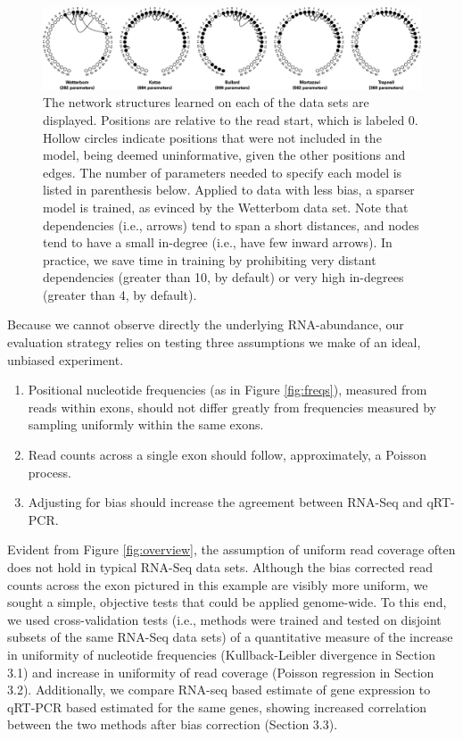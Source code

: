 \documentclass{bioinfo}
\begin{document}
\begin{figure}
\centerline{\includegraphics[width=\textwidth]{models.eps}}
\caption{
The network structures learned on each of the data sets are displayed. Positions
are relative to the read start, which is labeled 0. Hollow circles indicate
positions that were not included in the model, being deemed uninformative, given
the other positions and edges. The number of parameters needed to
specify each model is listed in parenthesis below. Applied to data with less
bias, a sparser model is trained, as evinced by the Wetterbom data set. Note
that dependencies (i.e., arrows) tend to span a short distances, and nodes tend
to have a small in-degree (i.e., have few inward arrows). In practice, we save
time in training by prohibiting very distant dependencies (greater than 10, by
default) or very high in-degrees (greater than 4, by default).
}
\label{fig:models}
\end{figure}


Because we cannot observe directly the underlying RNA-abundance, our evaluation
strategy relies on testing three assumptions we make of an ideal, unbiased experiment.
\begin{enumerate}
\item Positional nucleotide frequencies (as in Figure \ref{fig:freqs}), measured
from reads within exons, should not differ greatly from frequencies measured by
sampling uniformly within the same exons.
\item Read counts across a single exon should follow, approximately, a Poisson
process.
\item Adjusting for bias should increase the agreement between RNA-Seq and
qRT-PCR.
\end{enumerate}

Evident from Figure \ref{fig:overview}, the assumption of uniform read coverage
often does not hold in typical RNA-Seq data sets. Although the bias corrected
read counts across the exon pictured in this example are visibly more uniform,
we sought a simple, objective tests that could be applied genome-wide. To this
end, we used cross-validation tests (i.e., methods were trained and tested on
disjoint subsets of the same RNA-Seq data sets) of a quantitative measure of the
increase in uniformity of nucleotide frequencies (Kullback-Leibler divergence in
Section 3.1) and increase in uniformity of read coverage (Poisson regression in
Section 3.2). Additionally, we compare RNA-seq based estimate of gene expression
to qRT-PCR based estimated for the same genes, showing increased correlation
between the two methods after bias correction (Section 3.3).
\end{document}
